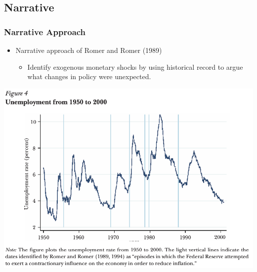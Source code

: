 \documentclass[english,xcolor=svgnames]{beamer}
\begin{document}
\subsection{Narrative}

\begin{frame}
\frametitle{Narrative Approach}
\begin{itemize}
	\item Narrative approach of Romer and Romer (1989)
	\begin{itemize}
		\item Identify exogenous monetary shocks by using historical record to argue what changes in policy were unexpected.
	\end{itemize}
\end{itemize}
\centering
\includegraphics[scale=0.55]{../../Images/NS2018narrative.png}
\end{frame}
\end{document}
